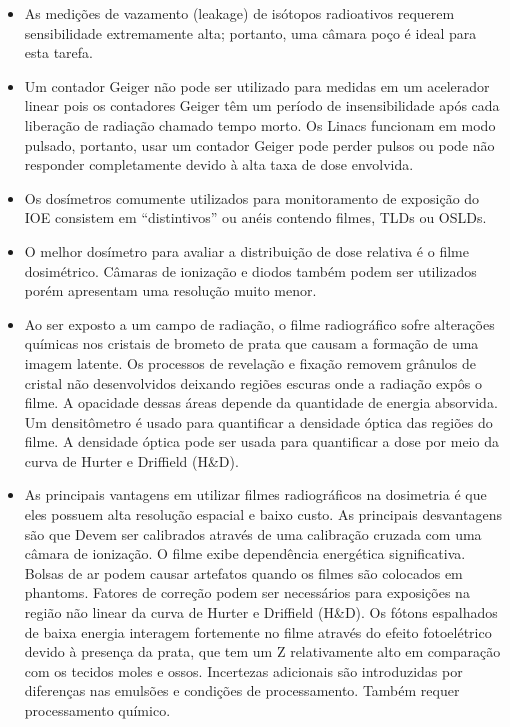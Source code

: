 \documentclass[11pt,a4paper]{article}
\newcounter{exemplo}
\begin{document}
\begin{exemplo}
\begin{itemize}
        \item As medições de vazamento (leakage) de isótopos radioativos requerem sensibilidade extremamente alta; portanto, uma câmara poço é ideal para esta tarefa.
        
        \item Um contador Geiger não pode ser utilizado para medidas em um acelerador linear pois os contadores Geiger têm um período de insensibilidade após cada liberação de radiação chamado tempo morto. Os Linacs funcionam em modo pulsado, portanto, usar um contador Geiger pode perder pulsos ou pode não responder completamente devido à alta taxa de dose envolvida.
        
        \item Os dosímetros comumente utilizados para monitoramento de exposição do IOE consistem em ``distintivos'' ou anéis contendo filmes, TLDs ou OSLDs.
        
        \item O melhor dosímetro para avaliar a distribuição de dose relativa é o filme dosimétrico. Câmaras de ionização e diodos também podem ser utilizados porém apresentam uma resolução muito menor.
        
        \item Ao ser exposto a um campo de radiação, o filme radiográfico sofre alterações químicas nos cristais de brometo de prata que causam a formação de uma imagem latente. Os processos de revelação e fixação removem grânulos de cristal não desenvolvidos deixando regiões escuras onde a radiação expôs o filme. A opacidade dessas áreas depende da quantidade de energia absorvida. Um densitômetro é usado para quantificar a densidade óptica das regiões do filme. A densidade óptica pode ser usada para quantificar a dose por meio da curva de Hurter e Driffield (H\&D).
        
        \item As principais vantagens em utilizar filmes radiográficos na dosimetria é que eles possuem alta resolução espacial e baixo custo. As principais desvantagens são que Devem ser calibrados através de uma calibração cruzada com uma câmara de ionização. O filme exibe dependência energética significativa. Bolsas de ar podem causar artefatos quando os filmes são colocados em phantoms. Fatores de correção podem ser necessários para exposições na região não linear da curva de Hurter e Driffield (H\&D). Os fótons espalhados de baixa energia interagem fortemente no filme através do efeito fotoelétrico devido à presença da prata, que tem um Z relativamente alto em comparação com os tecidos moles e ossos. Incertezas adicionais são introduzidas por diferenças nas emulsões e condições de processamento. Também requer processamento químico.
        

\end{itemize}
\end{exemplo}
\end{document}
